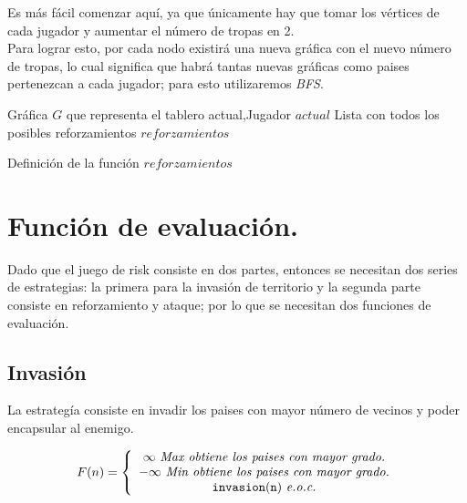 \documentclass[12pt,twocolumn,draft]{article}
\begin{document}
Es m\'as f\'acil comenzar aqu\'i, ya que \'unicamente hay que tomar los v\'ertices de cada jugador
y aumentar el n\'umero de tropas en 2.\\

Para lograr esto, por cada nodo existir\'a una nueva gr\'afica con el nuevo n\'umero de tropas, lo
cual significa que habr\'a tantas nuevas gr\'aficas como paises pertenezcan a cada jugador; para
esto utilizaremos \textit{BFS}.

\begin{algorithm}
\begin{algorithmic}[1]
\REQUIRE Gr\'afica $G$ que representa el tablero actual,Jugador $actual$
\ENSURE Lista con todos los posibles reforzamientos
\ENDFOR
{}
\ENDIF
\ENDFOR
\ENDWHILE
\RETURN $reforzamientos$
\end{algorithmic}
\caption{Definici\'on de la funci\'on $reforzamientos$}
\label{reforzamientos}
\end{algorithm}

\section{Funci\'on de evaluaci\'on.}

Dado que el juego de risk consiste en dos partes, entonces se necesitan dos series de estrategias: la
primera para la invasi\'on de territorio y la segunda parte consiste en reforzamiento y ataque;
por lo que se necesitan dos funciones de evaluaci\'on.

\subsection{Invasi\'on}

La estrateg\'ia consiste en invadir los paises con mayor n\'umero de vecinos y poder encapsular al enemigo.

$$ 
F(n)= \left\{\begin{array}{c l}
  \infty\ \textit{Max\ obtiene\ los\ paises\ con\ mayor\ grado.}\\
  -\infty\ \textit{Min\ obtiene\ los\ paises\ con\ mayor\ grado.}\\
  \mathtt{invasion(n)}\ \textit{e.o.c.}
\end{array}
\right.
$$
\end{document}
